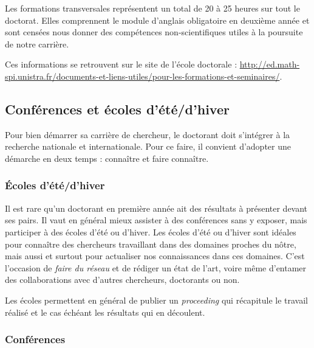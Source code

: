 \documentclass[a5paper]{article}
\begin{document}
\vspace{1em}

Les formations transversales représentent un total de 20 à 25 heures sur tout le doctorat. Elles comprennent le module d'anglais obligatoire en deuxième année et sont censées nous donner des compétences non-scientifiques utiles à la poursuite de notre carrière.

\vspace{2em}

Ces informations se retrouvent sur le site de l'école doctorale : \href{http://ed.math-spi.unistra.fr/documents-et-liens-utiles/pour-les-formations-et-seminaires/}{http://ed.math-spi.unistra.fr/documents-et-liens-utiles/pour-les-formations-et-seminaires/}.

\subsection{Conférences et écoles d'été/d'hiver}
\label{subsec:conf-ecoledete}

Pour bien démarrer sa carrière de chercheur, le doctorant doit s'intégrer à la recherche nationale et internationale. Pour ce faire, il convient d'adopter une démarche en deux temps : connaître et faire connaître.

\subsubsection{\'Ecoles d'été/d'hiver}
\label{subsubsec:ecoledete}

Il est rare qu'un doctorant en première année ait des résultats à présenter devant ses pairs. Il vaut en général mieux assister à des conférences sans y exposer, mais participer à des écoles d'été ou d'hiver. Les écoles d'été ou d'hiver sont idéales pour connaître des chercheurs travaillant dans des domaines proches du nôtre, mais aussi et surtout pour actualiser nos connaissances dans ces domaines. C'est l'occasion de \textit{faire du réseau} et de rédiger un état de l'art, voire même d'entamer des collaborations avec d'autres chercheurs, doctorants ou non.

Les écoles permettent en général de publier un \textit{proceeding} qui récapitule le travail réalisé et le cas échéant les résultats qui en découlent.

\subsubsection{Conférences}
\label{subsubsec:conf}
\end{document}
